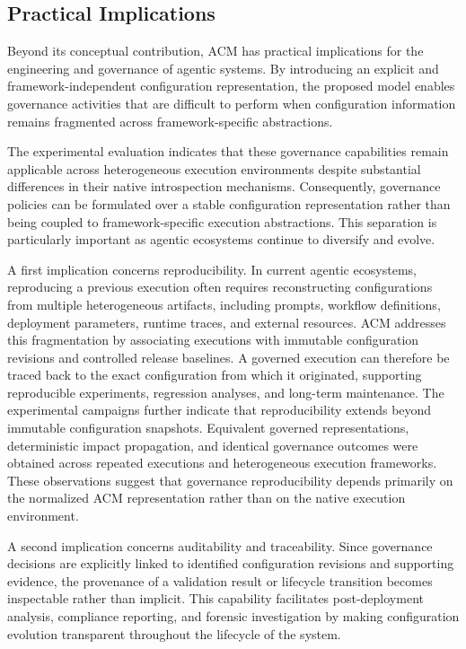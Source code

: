 \documentclass[10pt]{article}
\begin{document}
\subsection{Practical Implications}
\label{sec:practical_implications}

Beyond its conceptual contribution, ACM has practical implications for the engineering and governance of agentic systems. By introducing an explicit and framework-independent configuration representation, the proposed model enables governance activities that are difficult to perform when configuration information remains fragmented across framework-specific abstractions.

The experimental evaluation indicates that these governance capabilities remain applicable across heterogeneous execution environments despite substantial differences in their native introspection mechanisms. Consequently, governance policies can be formulated over a stable configuration representation rather than being coupled to framework-specific execution abstractions. This separation is particularly important as agentic ecosystems continue to diversify and evolve.

A first implication concerns reproducibility. In current agentic ecosystems, reproducing a previous execution often requires reconstructing configurations from multiple heterogeneous artifacts, including prompts, workflow definitions, deployment parameters, runtime traces, and external resources. ACM addresses this fragmentation by associating executions with immutable configuration revisions and controlled release baselines. A governed execution can therefore be traced back to the exact configuration from which it originated, supporting reproducible experiments, regression analyses, and long-term maintenance. The experimental campaigns further indicate that reproducibility extends beyond immutable configuration snapshots. Equivalent governed representations, deterministic impact propagation, and identical governance outcomes were obtained across repeated executions and heterogeneous execution frameworks. These observations suggest that governance reproducibility depends primarily on the normalized ACM representation rather than on the native execution environment.

A second implication concerns auditability and traceability. Since governance decisions are explicitly linked to identified configuration revisions and supporting evidence, the provenance of a validation result or lifecycle transition becomes inspectable rather than implicit. This capability facilitates post-deployment analysis, compliance reporting, and forensic investigation by making configuration evolution transparent throughout the lifecycle of the system.
\end{document}
